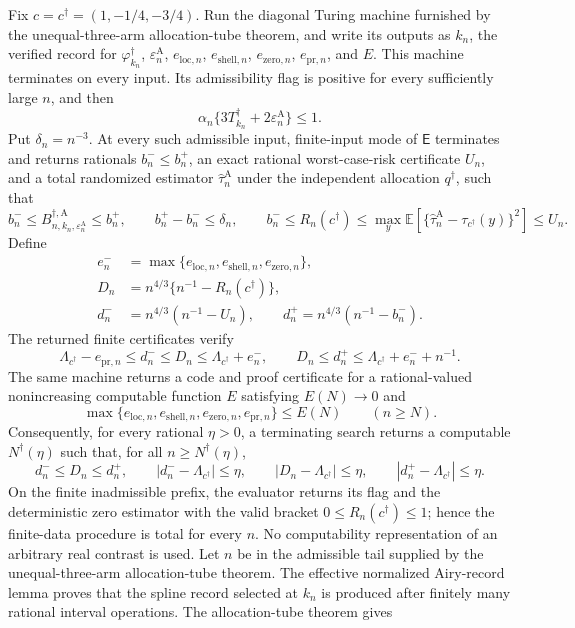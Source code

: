 Fix \(c=c^\dagger=(1,-1/4,-3/4)\).  Run the diagonal Turing machine furnished by the unequal-three-arm allocation-tube theorem, and write its outputs as \(k_n\), the verified record for \(\varphi_{k_n}^\dagger\), \(\varepsilon_n^{\mathrm A}\), \(e_{\mathrm{loc},n}\), \(e_{\mathrm{shell},n}\), \(e_{\mathrm{zero},n}\), \(e_{\mathrm{pr},n}\), and \(E\).  This machine terminates on every input.  Its admissibility flag is positive for every sufficiently large \(n\), and then
\[
\alpha_n\{3T_{k_n}^\dagger+2\varepsilon_n^{\mathrm A}\}\le 1.
\]
Put \(\delta_n=n^{-3}\).  At every such admissible input, finite-input mode of \(\mathsf E\) terminates and returns rationals \(b_n^-\le b_n^+\), an exact rational worst-case-risk certificate \(U_n\), and a total randomized estimator \(\widehat\tau_n^{\mathrm A}\) under the independent allocation \(q^\dagger\), such that
\[
b_n^-\le B_{n,k_n,\varepsilon_n^{\mathrm A}}^{\dagger,\mathrm A}
\le b_n^+,
\qquad b_n^+-b_n^-\le\delta_n,
\qquad
b_n^-\le R_n(c^\dagger)\le
\max_y\mathbb E\!\left[
\{\widehat\tau_n^{\mathrm A}-\tau_{c^\dagger}(y)\}^2
\right]\le U_n.
\]
Define
\[
\begin{aligned}
e_n^-&=\max\{e_{\mathrm{loc},n},e_{\mathrm{shell},n},e_{\mathrm{zero},n}\},\\
D_n&=n^{4/3}\{n^{-1}-R_n(c^\dagger)\},\\
d_n^-&=n^{4/3}(n^{-1}-U_n),
\qquad
d_n^+=n^{4/3}(n^{-1}-b_n^-).
\end{aligned}
\]
The returned finite certificates verify
\[
\Lambda_{c^\dagger}-e_{\mathrm{pr},n}
\le d_n^-\le D_n\le
\Lambda_{c^\dagger}+e_n^-,
\qquad
D_n\le d_n^+\le
\Lambda_{c^\dagger}+e_n^-+n^{-1}.
\]
The same machine returns a code and proof certificate for a rational-valued nonincreasing computable function \(E\) satisfying \(E(N)\to0\) and
\[
\max\{e_{\mathrm{loc},n},e_{\mathrm{shell},n},
e_{\mathrm{zero},n},e_{\mathrm{pr},n}\}\le E(N)
\qquad(n\ge N).
\]
Consequently, for every rational \(\eta>0\), a terminating search returns a computable \(N^\dagger(\eta)\) such that, for all \(n\ge N^\dagger(\eta)\),
\[
d_n^-\le D_n\le d_n^+,
\qquad
|d_n^--\Lambda_{c^\dagger}|\le\eta,
\qquad
|D_n-\Lambda_{c^\dagger}|\le\eta,
\qquad
|d_n^+-\Lambda_{c^\dagger}|\le\eta.
\]
On the finite inadmissible prefix, the evaluator returns its flag and the deterministic zero estimator with the valid bracket \(0\le R_n(c^\dagger)\le1\); hence the finite-data procedure is total for every \(n\).  No computability representation of an arbitrary real contrast is used.
Let \(n\) be in the admissible tail supplied by the unequal-three-arm allocation-tube theorem.  The effective normalized Airy-record lemma proves that the spline record selected at \(k_n\) is produced after finitely many rational interval operations.  The allocation-tube theorem gives
